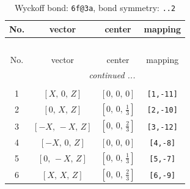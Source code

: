 \documentclass[fleqn,8pt]{jsarticle}
\begin{document}
\begin{longtable}{cccc}
\caption{Wyckoff bond: {\tt 6f@3a}, bond symmetry: {\tt ..2}}
 \\
 \hline \hline
No. & vector & center & mapping \\ \hline \endfirsthead

\multicolumn{3}{l}{\tablename\ \thetable{}} \\
 \hline \hline
No. & vector & center & mapping \\ \hline \endhead

 \hline \hline
\multicolumn{3}{r}{\footnotesize\it continued ...} \\ \endfoot

 \hline \hline
\multicolumn{3}{r}{} \\ \endlastfoot

1 & $\left[ X,\, 0,\, Z \right]$ & $\left[ 0,\, 0,\, 0 \right]$ & {\tt [1,-11]} \\ \hline
2 & $\left[ 0,\, X,\, Z \right]$ & $\left[ 0,\, 0,\, \frac{1}{3} \right]$ & {\tt [2,-10]} \\ \hline
3 & $\left[ - X,\, - X,\, Z \right]$ & $\left[ 0,\, 0,\, \frac{2}{3} \right]$ & {\tt [3,-12]} \\ \hline
4 & $\left[ - X,\, 0,\, Z \right]$ & $\left[ 0,\, 0,\, 0 \right]$ & {\tt [4,-8]} \\ \hline
5 & $\left[ 0,\, - X,\, Z \right]$ & $\left[ 0,\, 0,\, \frac{1}{3} \right]$ & {\tt [5,-7]} \\ \hline
6 & $\left[ X,\, X,\, Z \right]$ & $\left[ 0,\, 0,\, \frac{2}{3} \right]$ & {\tt [6,-9]} \\
\end{longtable}
\renewcommand{\arraystretch}{1.2}
\end{document}
